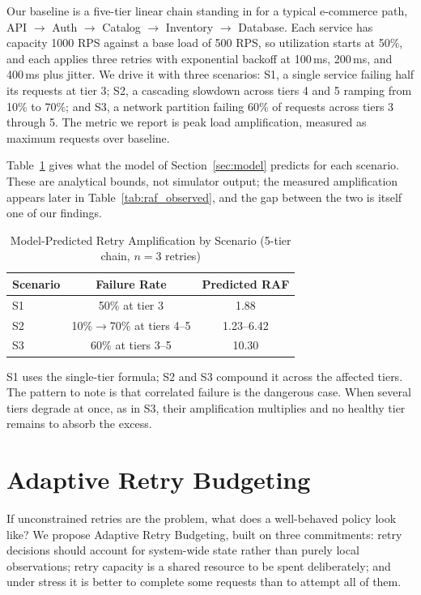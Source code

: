 \documentclass[conference]{IEEEtran}
\begin{document}
Our baseline is a five-tier linear chain standing in for a typical e-commerce path, API $\rightarrow$ Auth $\rightarrow$ Catalog $\rightarrow$ Inventory $\rightarrow$ Database. Each service has capacity 1000 RPS against a base load of 500 RPS, so utilization starts at 50\%, and each applies three retries with exponential backoff at 100\,ms, 200\,ms, and 400\,ms plus jitter. We drive it with three scenarios: S1, a single service failing half its requests at tier 3; S2, a cascading slowdown across tiers 4 and 5 ramping from 10\% to 70\%; and S3, a network partition failing 60\% of requests across tiers 3 through 5. The metric we report is peak load amplification, measured as maximum requests over baseline.

Table~\ref{tab:amplification} gives what the model of Section~\ref{sec:model} predicts for each scenario. These are analytical bounds, not simulator output; the measured amplification appears later in Table~\ref{tab:raf_observed}, and the gap between the two is itself one of our findings.

\begin{table}[htbp]
\caption{Model-Predicted Retry Amplification by Scenario (5-tier chain, $n=3$ retries)}
\label{tab:amplification}
\centering
\small
\setlength{\tabcolsep}{4pt}
\begin{tabular}{@{}lcc@{}}
\toprule
\textbf{Scenario} & \textbf{Failure Rate} & \textbf{Predicted RAF} \\
\midrule
S1 & 50\% at tier 3 & 1.88 \\
S2 & 10\%$\rightarrow$70\% at tiers 4--5 & 1.23--6.42 \\
S3 & 60\% at tiers 3--5 & 10.30 \\
\bottomrule
\end{tabular}
\end{table}

S1 uses the single-tier formula; S2 and S3 compound it across the affected tiers. The pattern to note is that correlated failure is the dangerous case. When several tiers degrade at once, as in S3, their amplification multiplies and no healthy tier remains to absorb the excess.

\section{Adaptive Retry Budgeting}
\label{sec:arb}

If unconstrained retries are the problem, what does a well-behaved policy look like? We propose Adaptive Retry Budgeting, built on three commitments: retry decisions should account for system-wide state rather than purely local observations; retry capacity is a shared resource to be spent deliberately; and under stress it is better to complete some requests than to attempt all of them.
\end{document}
